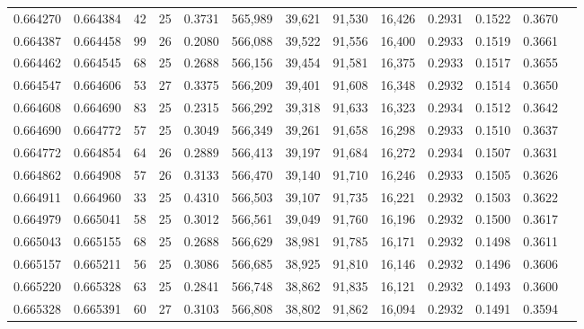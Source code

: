 \begin{tabular}{rrrrrrrrrrrrr}
0.664270 & 0.664384 &  42 &  25 &                                     0.3731 & 565,989 &  39,621 &  91,530 &  16,426 & 0.2931 & 0.1522 & 0.3670 \\
0.664387 & 0.664458 &  99 &  26 &                                     0.2080 & 566,088 &  39,522 &  91,556 &  16,400 & 0.2933 & 0.1519 & 0.3661 \\
0.664462 & 0.664545 &  68 &  25 &                                     0.2688 & 566,156 &  39,454 &  91,581 &  16,375 & 0.2933 & 0.1517 & 0.3655 \\
0.664547 & 0.664606 &  53 &  27 &                                     0.3375 & 566,209 &  39,401 &  91,608 &  16,348 & 0.2932 & 0.1514 & 0.3650 \\
0.664608 & 0.664690 &  83 &  25 &                                     0.2315 & 566,292 &  39,318 &  91,633 &  16,323 & 0.2934 & 0.1512 & 0.3642 \\
0.664690 & 0.664772 &  57 &  25 &                                     0.3049 & 566,349 &  39,261 &  91,658 &  16,298 & 0.2933 & 0.1510 & 0.3637 \\
0.664772 & 0.664854 &  64 &  26 &                                     0.2889 & 566,413 &  39,197 &  91,684 &  16,272 & 0.2934 & 0.1507 & 0.3631 \\
0.664862 & 0.664908 &  57 &  26 &                                     0.3133 & 566,470 &  39,140 &  91,710 &  16,246 & 0.2933 & 0.1505 & 0.3626 \\
0.664911 & 0.664960 &  33 &  25 &                                     0.4310 & 566,503 &  39,107 &  91,735 &  16,221 & 0.2932 & 0.1503 & 0.3622 \\
0.664979 & 0.665041 &  58 &  25 &                                     0.3012 & 566,561 &  39,049 &  91,760 &  16,196 & 0.2932 & 0.1500 & 0.3617 \\
0.665043 & 0.665155 &  68 &  25 &                                     0.2688 & 566,629 &  38,981 &  91,785 &  16,171 & 0.2932 & 0.1498 & 0.3611 \\
0.665157 & 0.665211 &  56 &  25 &                                     0.3086 & 566,685 &  38,925 &  91,810 &  16,146 & 0.2932 & 0.1496 & 0.3606 \\
0.665220 & 0.665328 &  63 &  25 &                                     0.2841 & 566,748 &  38,862 &  91,835 &  16,121 & 0.2932 & 0.1493 & 0.3600 \\
0.665328 & 0.665391 &  60 &  27 &                                     0.3103 & 566,808 &  38,802 &  91,862 &  16,094 & 0.2932 & 0.1491 & 0.3594 \\

\end{tabular}
